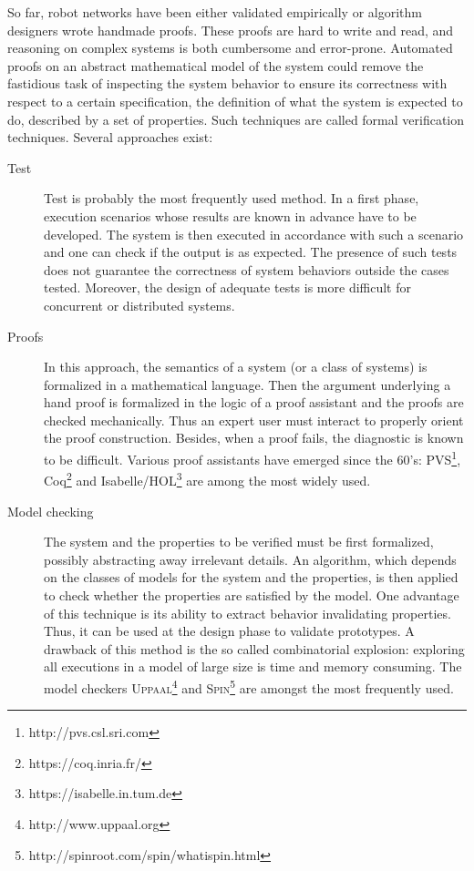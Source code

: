 So far, robot networks have been either validated empirically or algorithm designers wrote handmade proofs. 
These proofs are hard to write and read, and reasoning on complex systems is both cumbersome and error-prone. 
Automated proofs on an abstract mathematical model of the system could remove the fastidious task of inspecting the system behavior to ensure its correctness with respect to a certain specification, \ie the definition of what  the system is expected to do, described by a set of properties.
Such techniques are called formal verification techniques.
Several approaches exist: 
\begin{description}
\item [Test\hfill]  Test is probably the most frequently used method. In a first phase, execution scenarios whose results are known in advance have to be developed. The system is then executed in accordance with such a scenario and one can check if the output is as expected.
The presence of such tests does not guarantee the correctness of system behaviors outside the cases tested. Moreover, the design of adequate tests is more difficult for concurrent or distributed systems.
\item [Proofs\hfill]  In this approach, 
the semantics of a system (or a class of systems) is formalized in a mathematical language. Then the argument underlying a hand proof is formalized in the logic of a proof assistant and the proofs are checked mechanically.
Thus an expert user must interact to properly orient the proof construction. Besides, when a proof fails, the diagnostic is known to be difficult.
Various proof assistants have emerged since the 60’s: PVS\footnote{http://pvs.csl.sri.com}, Coq\footnote{https://coq.inria.fr/} and Isabelle/HOL\footnote{https://isabelle.in.tum.de} are among the most widely used.
\item [Model checking\hfill]  The system and the properties to be verified must be first formalized, possibly abstracting away irrelevant details. An algorithm, which depends on the classes of models for the system and the properties, is then applied to check whether the properties are satisfied by the model. One advantage of this technique is its ability to extract behavior invalidating properties. Thus, it can be used at the design phase to validate prototypes. A drawback of this method is the so called combinatorial explosion: exploring all executions in a model of large size is time and memory consuming.
The model checkers \textsc{Uppaal}\footnote{http://www.uppaal.org} and \textsc{Spin}\footnote{http://spinroot.com/spin/whatispin.html} are amongst the most frequently used.
\end{description}
